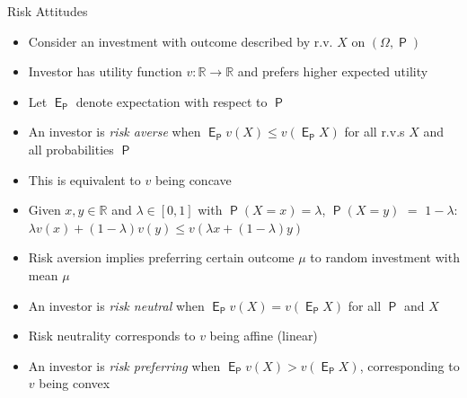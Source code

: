 \documentclass[10pt,handout]{beamer}
\newcommand{\ds}{\displaystyle}
\DeclareMathOperator\prb{\mathsf{P}}
\DeclareMathOperator\expc{\mathsf{E}}
\theoremstyle{definition}
\begin{document}
\begin{frame}{Risk Attitudes}
  \begin{itemize}[<+->]
    \item Consider an investment with outcome described by r.v. $X$ on $(\Omega, \prb)$
    \item Investor has utility function $v: \mathbb{R} \to \mathbb{R}$ and prefers higher expected utility
    \item Let $\expc_{\prb}$ denote expectation with respect to $\prb$
    \item An investor is \emph{risk averse} when $\ds\expc_{\prb} v(X) \leqslant v(\expc_{\prb} X)$
      for all r.v.s $X$ and all probabilities $\prb$
    \item This is equivalent to $v$ being concave
    \item Given $x, y \in \mathbb{R}$ and $\lambda \in [0, 1]$ with $\prb(X = x) = \lambda$, $\ds\prb(X = y)$ $=$ $\ds 1 - \lambda$: $\ds\lambda v(x) + (1-\lambda)v(y) \leqslant v(\lambda x + (1-\lambda)y)$
    \item Risk aversion implies preferring certain outcome $\mu$ to random investment with mean $\mu$
    \item An investor is \emph{risk neutral} when $\expc_{\prb} v(X) = v(\expc_{\prb} X)$ for all $\prb$ and $X$
    \item Risk neutrality corresponds to $v$ being affine (linear)
    \item An investor is \emph{risk preferring} when $\expc_{\prb} v(X) > v(\expc_{\prb} X)$, corresponding to $v$ being convex
  \end{itemize}
\end{frame}
\end{document}
